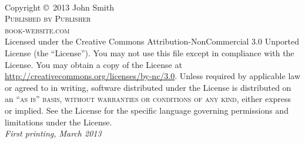 \documentclass[11pt]{book} %
\begin{document}

\begingroup
\thispagestyle{empty}
\vfill
\endgroup


\newpage
~\vfill
\thispagestyle{empty}

\noindent Copyright \copyright\ 2013 John Smith\\ %

\noindent \textsc{Published by Publisher}\\ %

\noindent \textsc{book-website.com}\\ %

\noindent Licensed under the Creative Commons Attribution-NonCommercial 3.0 Unported License (the ``License''). You may not use this file except in compliance with the License. You may obtain a copy of the License at \url{http://creativecommons.org/licenses/by-nc/3.0}. Unless required by applicable law or agreed to in writing, software distributed under the License is distributed on an \textsc{``as is'' basis, without warranties or conditions of any kind}, either express or implied. See the License for the specific language governing permissions and limitations under the License.\\ %

\noindent \textit{First printing, March 2013} %

\end{document}
